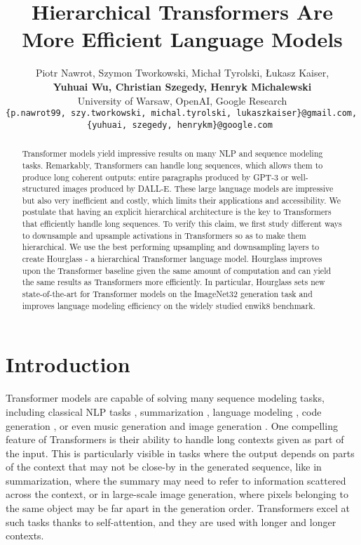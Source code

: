 \documentclass[11pt]{article}
\title{Hierarchical Transformers Are More Efficient Language Models}
\author{Piotr Nawrot, Szymon Tworkowski, Michał Tyrolski, Łukasz Kaiser, \\
	{\bf Yuhuai Wu, Christian Szegedy, Henryk Michalewski }\\
	University of Warsaw, OpenAI, Google Research \\
	{\small \texttt{\{p.nawrot99, szy.tworkowski, michal.tyrolski, lukaszkaiser\}@gmail.com, }} 
	\\
	{\small \texttt{\{yuhuai, szegedy, henrykm\}@google.com }}
}
\begin{document}
\maketitle

\renewcommand{\thefootnote}{\fnsymbol{footnote}}
\renewcommand{\thefootnote}{\arabic{footnote}}

\begin{abstract}
 Transformer models yield impressive results on many NLP and sequence modeling tasks. Remarkably, Transformers can handle long sequences, which allows them to produce long coherent outputs: entire paragraphs produced by GPT-3 or well-structured images produced by DALL-E. These large language models are impressive but also very inefficient and costly, which limits their applications and accessibility. We postulate that having an explicit hierarchical architecture is the key to Transformers that efficiently handle long sequences. To verify this claim, we first study different ways to downsample and upsample activations in Transformers so as to make them hierarchical. We use the best performing upsampling and downsampling layers to create Hourglass - a hierarchical Transformer language model. Hourglass improves upon the Transformer baseline given the same amount of computation and can yield the same results as Transformers more efficiently. In particular, Hourglass sets new state-of-the-art for Transformer models on the ImageNet32 generation task and improves language modeling efficiency on the widely studied enwik8 benchmark.
\end{abstract}

\section{Introduction}

Transformer models \cite{vaswani2017attention} are capable of
solving many sequence modeling tasks, including classical NLP
tasks \cite{devlin2019bert}, summarization \cite{zhang2020pegasus}, language modeling \cite{radford2019language, brown2020language}, code generation \cite{chen2021evaluating}, or even music generation \cite{huang2018music, dhariwal2020jukebox} and image generation \cite{parmar2018image, pmlr-v119-chen20s, ramesh2021zeroshot}.
One compelling feature of Transformers is their ability
to handle long contexts given as part of the input. This is particularly visible in tasks where the output depends on parts of the context that may not be close-by in the generated sequence, like in
summarization, where the summary may need to refer to information scattered across the context, or in large-scale image generation, where pixels belonging to the same object may be far apart in the generation order. Transformers excel at such tasks thanks to self-attention, and they are used with longer and longer contexts. 
\end{document}

